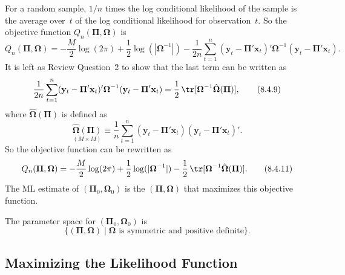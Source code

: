 For a random sample, $1/n$ times the log conditional likelihood of the sample
is the average over~$t$ of the log conditional likelihood for observation~$t$. So the
objective function $Q_n(\boldsymbol{\Pi}, \boldsymbol{\Omega})$ is
\begin{equation}
  Q_n(\boldsymbol{\Pi}, \boldsymbol{\Omega})
  = -\frac{M}{2}\log(2\pi)
    + \frac{1}{2}\log(|\boldsymbol{\Omega}^{-1}|)
    - \frac{1}{2n}\sum_{t=1}^{n}
      (\mathbf{y}_t - \boldsymbol{\Pi}'\mathbf{x}_t)'
      \boldsymbol{\Omega}^{-1}
      (\mathbf{y}_t - \boldsymbol{\Pi}'\mathbf{x}_t).
  \label{eq:8.4.8} \tag{8.4.8}
\end{equation}
It is left as Review Question~2 to show that the last term can be written as
\begin{equation}
  \frac{1}{2n}\sum_{t=1}^{n}
    (\mathbf{y}_t - \boldsymbol{\Pi}'\mathbf{x}_t)'
    \boldsymbol{\Omega}^{-1}
    (\mathbf{y}_t - \boldsymbol{\Pi}'\mathbf{x}_t)
  = \frac{1}{2}\,\tr[\boldsymbol{\Omega}^{-1}\hat{\boldsymbol{\Omega}}(\boldsymbol{\Pi})],
  \label{eq:8.4.9} \tag{8.4.9}
\end{equation}
where $\hat{\boldsymbol{\Omega}}(\boldsymbol{\Pi})$ is defined as
\begin{equation}
  \underset{(M \times M)}{\hat{\boldsymbol{\Omega}}(\boldsymbol{\Pi})}
  \equiv \frac{1}{n}\sum_{t=1}^{n}
    (\mathbf{y}_t - \boldsymbol{\Pi}'\mathbf{x}_t)
    (\mathbf{y}_t - \boldsymbol{\Pi}'\mathbf{x}_t)'.
  \label{eq:8.4.10} \tag{8.4.10}
\end{equation}
So the objective function can be rewritten as
\begin{equation}
  Q_n(\boldsymbol{\Pi}, \boldsymbol{\Omega})
  = -\frac{M}{2}\log(2\pi)
    + \frac{1}{2}\log(|\boldsymbol{\Omega}^{-1}|)
    - \frac{1}{2}\,\tr[\boldsymbol{\Omega}^{-1}\hat{\boldsymbol{\Omega}}(\boldsymbol{\Pi})].
  \label{eq:8.4.11} \tag{8.4.11}
\end{equation}
The ML estimate of $(\boldsymbol{\Pi}_0, \boldsymbol{\Omega}_0)$ is the $(\boldsymbol{\Pi}, \boldsymbol{\Omega})$ that maximizes this objective function.

The parameter space for $(\boldsymbol{\Pi}_0, \boldsymbol{\Omega}_0)$ is
\[
  \{(\boldsymbol{\Pi}, \boldsymbol{\Omega}) \mid \boldsymbol{\Omega} \text{ is symmetric and positive definite}\}.
\]

\subsection*{Maximizing the Likelihood Function}

